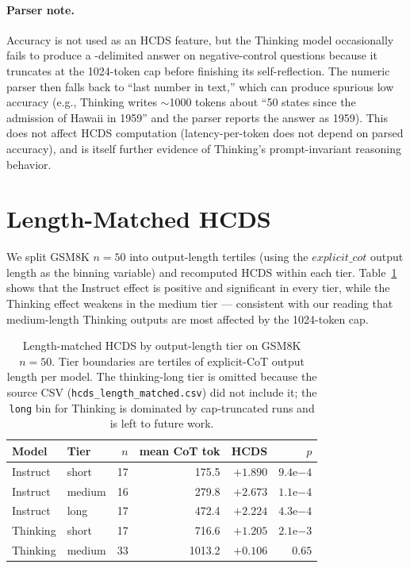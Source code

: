 \documentclass{article}
\theoremstyle{plain}
\theoremstyle{definition}
\theoremstyle{remark}
\begin{document}
\paragraph{Parser note.} Accuracy is not used as an HCDS feature, but
the Thinking model occasionally fails to produce a
$\boxed{}$-delimited answer on negative-control questions because it
truncates at the 1024-token cap before finishing its self-reflection.
The numeric parser then falls back to ``last number in text,'' which
can produce spurious low accuracy (e.g., Thinking writes
$\sim$1000 tokens about ``50 states since the admission of Hawaii in
1959'' and the parser reports the answer as 1959). This does not
affect HCDS computation (latency-per-token does not depend on parsed
accuracy), and is itself further evidence of Thinking's
prompt-invariant reasoning behavior.

\section{Length-Matched HCDS}
\label{app:length-matched}

We split GSM8K $n{=}50$ into output-length tertiles (using the
$\textit{explicit\_cot}$ output length as the binning variable) and
recomputed HCDS within each tier. Table~\ref{tab:length-matched} shows
that the Instruct effect is positive and significant in every tier,
while the Thinking effect weakens in the medium tier --- consistent
with our reading that medium-length Thinking outputs are most affected
by the 1024-token cap.

\begin{table}[h]
\centering
\small
\begin{tabular}{llrrrr}
\toprule
Model & Tier & $n$ & mean CoT tok & HCDS & $p$ \\
\midrule
Instruct & short  & 17 & 175.5  & $+1.890$ & $9.4\mathrm{e}{-4}$ \\
Instruct & medium & 16 & 279.8  & $+2.673$ & $1.1\mathrm{e}{-4}$ \\
Instruct & long   & 17 & 472.4  & $+2.224$ & $4.3\mathrm{e}{-4}$ \\
Thinking & short  & 17 & 716.6  & $+1.205$ & $2.1\mathrm{e}{-3}$ \\
Thinking & medium & 33 & 1013.2 & $+0.106$ & $0.65$ \\
\bottomrule
\end{tabular}
\caption{Length-matched HCDS by output-length tier on GSM8K $n{=}50$.
Tier boundaries are tertiles of explicit-CoT output length per model.
The thinking-long tier is omitted because the source CSV
(\texttt{hcds\_length\_matched.csv}) did not include it; the
\texttt{long} bin for Thinking is dominated by cap-truncated runs and
is left to future work.}
\label{tab:length-matched}
\end{table}
\end{document}
